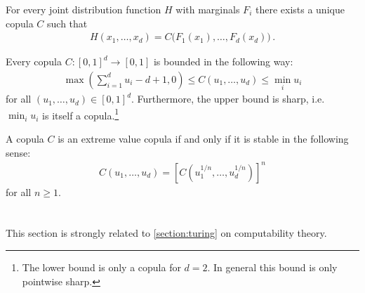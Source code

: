     \begin{theorem}[Sklar]
        For every joint distribution function $H$ with marginals $F_i$ there exists a unique copula $C$ such that
        \begin{gather}
            H(x_1,\ldots,x_d) = C\bigl(F_1(x_1),\ldots,F_d(x_d)\bigr)\,.
        \end{gather}
    \end{theorem}

    \begin{property}
        Every copula $C:[0,1]^d\rightarrow[0,1]$ is bounded in the following way:
        \begin{gather}
            \max\left(\sum_{i=1}^du_i-d+1,0\right)\leq C(u_1,\ldots,u_d)\leq \min_iu_i
        \end{gather}
        for all $(u_1,\ldots,u_d)\in[0,1]^d$. Furthermore, the upper bound is sharp, i.e.~$\min_iu_i$ is itself a copula.\footnote{The lower bound is only a copula for $d=2$. In general this bound is only pointwise sharp.}
    \end{property}

    \begin{property}
        A copula $C$ is an extreme value copula if and only if it is stable in the following sense:
        \begin{gather}
            C(u_1,\ldots,u_d) = \left[C(u_1^{1/n},\ldots,u_d^{1/n})\right]^n
        \end{gather}
        for all $n\geq1$.
    \end{property}

\section{}

    This section is strongly related to \cref{section:turing} on computability theory.


